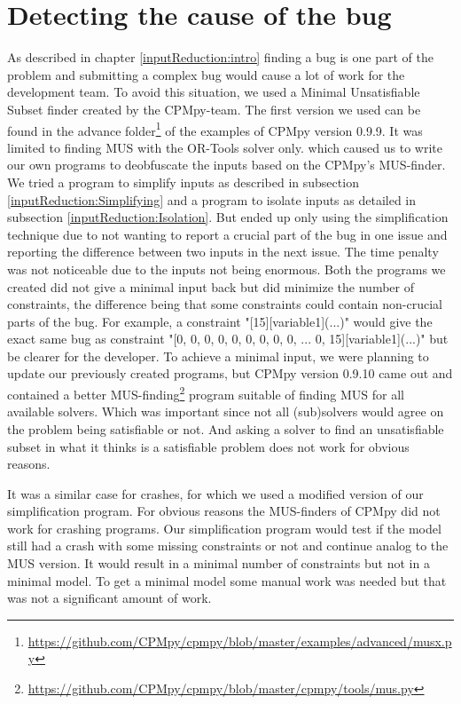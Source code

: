 \section{Detecting the cause of the bug}
\label{impl:DetectingCause}
As described in chapter \ref{inputReduction:intro} finding a bug is one part of the problem and submitting a complex bug would cause a lot of work for the development team. To avoid this situation, we used a Minimal Unsatisfiable Subset finder created by the CPMpy-team. The first version we used can be found in the advance folder\footnote{\url{https://github.com/CPMpy/cpmpy/blob/master/examples/advanced/musx.py}} of the examples of CPMpy version 0.9.9. It was limited to finding MUS with the OR-Tools solver only. which caused us to write our own programs to deobfuscate the inputs based on the CPMpy's MUS-finder. We tried a program to simplify inputs as described in subsection \ref{inputReduction:Simplifying} and a program to isolate inputs as detailed in subsection \ref{inputReduction:Isolation}. But ended up only using the simplification technique due to not wanting to report a crucial part of the bug in one issue and reporting the difference between two inputs in the next issue. The time penalty was not noticeable due to the inputs not being enormous. Both the programs we created did not give a minimal input back but did minimize the number of constraints, the difference being that some constraints could contain non-crucial parts of the bug. For example, a constraint "[15][variable1](...)" would give the exact same bug as constraint "[0, 0, 0, 0, 0, 0, 0, 0, 0, ... 0, 15][variable1](...)" but be clearer for the developer. To achieve a minimal input, we were planning to update our previously created programs, but CPMpy version 0.9.10 came out and contained a better MUS-finding\footnote{\url{https://github.com/CPMpy/cpmpy/blob/master/cpmpy/tools/mus.py}} program  suitable of finding MUS for all available solvers. Which was important since not all (sub)solvers would agree on the problem being satisfiable or not. And asking a solver to find an unsatisfiable subset in what it thinks is a satisfiable problem does not work for obvious reasons. 


It was a similar case for crashes, for which we used a modified version of our simplification program. For obvious reasons the MUS-finders of CPMpy did not work for crashing programs. Our simplification program would test if the model still had a crash with some missing constraints or not and continue analog to the MUS version. It would result in a minimal number of constraints but not in a minimal model. To get a minimal model some manual work was needed but that was not a significant amount of work. 

